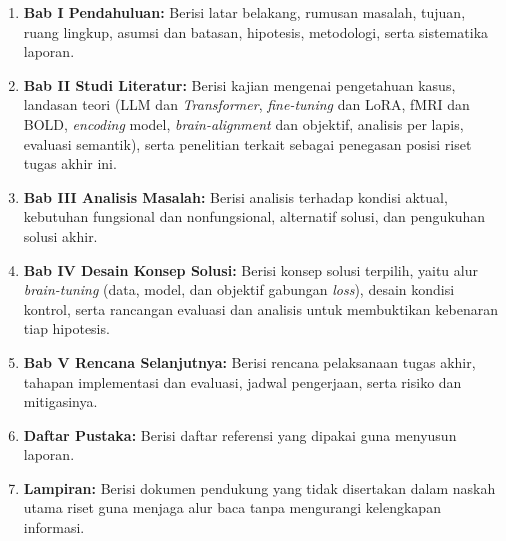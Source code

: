 \begin{enumerate}
    \item \textbf{Bab I Pendahuluan:} Berisi latar belakang, rumusan masalah, tujuan, ruang lingkup, asumsi dan batasan, hipotesis, metodologi, serta sistematika laporan.
    \item \textbf{Bab II Studi Literatur:} Berisi kajian  mengenai pengetahuan kasus, landasan teori (LLM dan \textit{Transformer}, \textit{fine-tuning} dan LoRA, fMRI dan BOLD, \textit{encoding} model, \textit{brain-alignment} dan objektif, analisis per lapis, evaluasi semantik), serta penelitian terkait sebagai penegasan posisi riset tugas akhir ini.
    \item \textbf{Bab III Analisis Masalah:} Berisi analisis terhadap kondisi aktual, kebutuhan fungsional dan nonfungsional, alternatif solusi, dan pengukuhan solusi akhir.
    \item \textbf{Bab IV Desain Konsep Solusi:} Berisi konsep solusi terpilih, yaitu alur \textit{brain-tuning} (data, model, dan objektif gabungan \textit{loss}), desain kondisi kontrol, serta rancangan evaluasi dan analisis untuk membuktikan kebenaran tiap hipotesis.
    \item \textbf{Bab V Rencana Selanjutnya:} Berisi rencana pelaksanaan tugas akhir, tahapan implementasi dan evaluasi, jadwal pengerjaan, serta risiko dan mitigasinya.
    \item \textbf{Daftar Pustaka:} Berisi daftar referensi yang dipakai guna menyusun laporan.
    \item \textbf{Lampiran:} Berisi dokumen pendukung yang tidak disertakan dalam naskah utama riset guna menjaga alur baca tanpa mengurangi kelengkapan informasi.
\end{enumerate}